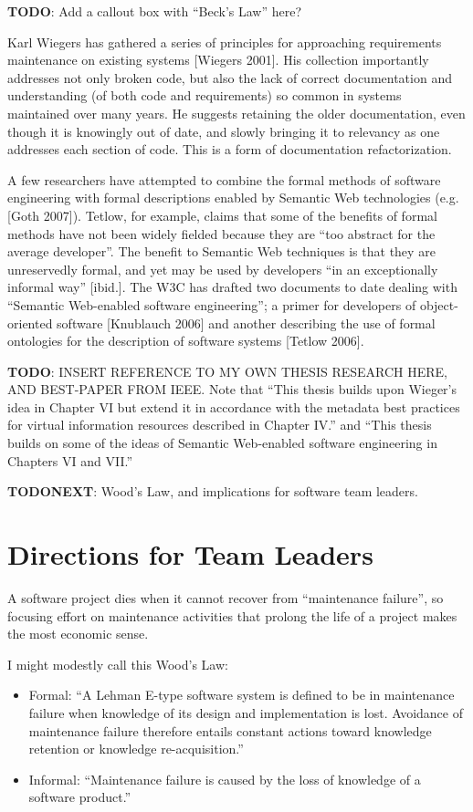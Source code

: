 \textbf{TODO}: Add a callout box with ``Beck's Law'' here?

Karl Wiegers has gathered a series of principles for approaching requirements maintenance on existing systems [Wiegers 2001].  His collection importantly addresses not only broken code, but also the lack of correct documentation and understanding (of both code and requirements) so common in systems maintained over many years.  He suggests retaining the older documentation, even though it is knowingly out of date, and slowly bringing it to relevancy as one addresses each section of code.  This is a form of documentation refactorization.

A few researchers have attempted to combine the formal methods of software engineering with formal descriptions enabled by Semantic Web technologies (e.g. [Goth 2007]).  Tetlow, for example, claims that some of the benefits of formal methods have not been widely fielded because they are ``too abstract for the average developer''.   The benefit to Semantic Web techniques is that they are unreservedly formal, and yet may be used by developers ``in an exceptionally informal way'' [ibid.].  The W3C has drafted two documents to date dealing with ``Semantic Web-enabled software engineering''; a primer for developers of object-oriented software [Knublauch 2006] and another describing the use of formal ontologies for the description of software systems [Tetlow 2006]. 

\textbf{TODO}: INSERT REFERENCE TO MY OWN THESIS RESEARCH HERE, AND BEST-PAPER FROM IEEE. Note that ``This thesis builds upon Wieger's idea in Chapter VI but extend it in accordance with the metadata best practices for virtual information resources described in Chapter IV.'' and ``This thesis builds on some of the ideas of Semantic Web-enabled software engineering in Chapters VI and VII.''


\textbf{TODONEXT}: Wood's Law, and implications for software team leaders.
\section{Directions for Team Leaders}

A software project dies when it cannot recover from ``maintenance failure'', so focusing effort on maintenance activities that prolong the life of a project makes the most economic sense.

I might modestly call this Wood's Law:

\begin{itemize}
	\item Formal: ``A Lehman E-type software system is defined to be in maintenance failure when knowledge of its design and implementation is lost. Avoidance of maintenance failure therefore entails constant actions toward knowledge retention or knowledge re-acquisition.''
	\item Informal: ``Maintenance failure is caused by the loss of knowledge of a software product.''
\end{itemize}

